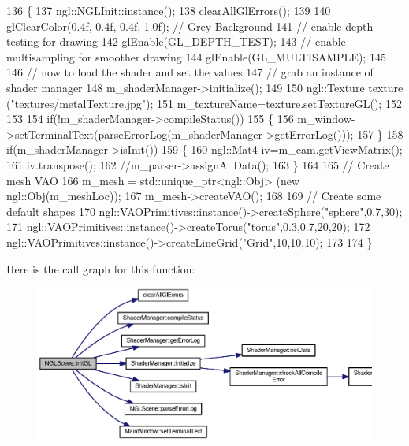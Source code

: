 \begin{DoxyCode}
136 \{
137   ngl::NGLInit::instance();
138   clearAllGlErrors();
139 
140   glClearColor(0.4f, 0.4f, 0.4f, 1.0f);        \textcolor{comment}{// Grey Background}
141   \textcolor{comment}{// enable depth testing for drawing}
142   glEnable(GL\_DEPTH\_TEST);
143   \textcolor{comment}{// enable multisampling for smoother drawing}
144   glEnable(GL\_MULTISAMPLE);
145 
146   \textcolor{comment}{// now to load the shader and set the values}
147   \textcolor{comment}{// grab an instance of shader manager}
148   m_shaderManager->initialize();
149 
150   ngl::Texture texture (\textcolor{stringliteral}{"textures/metalTexture.jpg"});
151   m_textureName=texture.setTextureGL();
152 
153 
154   \textcolor{keywordflow}{if}(!m_shaderManager->compileStatus())
155   \{
156     m_window->setTerminalText(parseErrorLog(m_shaderManager->getErrorLog()));
157   \}
158   \textcolor{keywordflow}{if}(m_shaderManager->isInit())
159   \{
160     ngl::Mat4 iv=m_cam.getViewMatrix();
161     iv.transpose();
162     \textcolor{comment}{//m\_parser->assignAllData();}
163   \}
164 
165   \textcolor{comment}{// Create mesh VAO}
166   m_mesh = std::unique\_ptr<ngl::Obj> (\textcolor{keyword}{new} ngl::Obj(m_meshLoc));
167   m_mesh->createVAO();
168 
169   \textcolor{comment}{// Create some default shapes}
170   ngl::VAOPrimitives::instance()->createSphere(\textcolor{stringliteral}{"sphere"},0.7,30);
171   ngl::VAOPrimitives::instance()->createTorus(\textcolor{stringliteral}{"torus"},0.3,0.7,20,20);
172   ngl::VAOPrimitives::instance()->createLineGrid(\textcolor{stringliteral}{"Grid"},10,10,10);
173 
174 \}
\end{DoxyCode}


Here is the call graph for this function\-:
\nopagebreak
\begin{figure}[H]
\begin{center}
\leavevmode
\includegraphics[width=350pt]{class_n_g_l_scene_a40efee086fe1c2c956e6d66774d9d18f_cgraph}
\end{center}
\end{figure}




